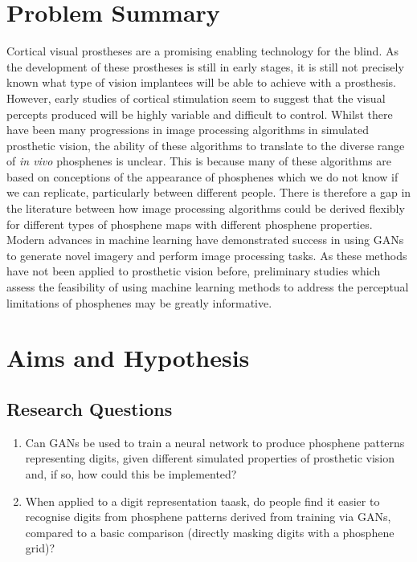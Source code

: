 \documentclass[a4paper,11pt,openany]{book}
\begin{document}
\clearpage

\chapter{Problem Summary}
\label{sec:org5a32aca}

Cortical visual prostheses are a promising enabling technology for the blind.
As the development of these prostheses is still in early stages, it is still not precisely known what type of vision implantees will be able to achieve with a prosthesis.
However, early studies of cortical stimulation seem to suggest that the visual percepts produced will be highly variable and difficult to control.
Whilst there have been many progressions in image processing algorithms in simulated prosthetic vision, the ability of these algorithms to translate to the diverse range of \emph{in vivo} phosphenes is unclear.
This is because many of these algorithms are based on conceptions of the appearance of phosphenes which we do not know if we can replicate, particularly between different people.
There is therefore a gap in the literature between how image processing algorithms could be derived flexibly for different types of phosphene maps with different phosphene properties.
Modern advances in machine learning have demonstrated success in using GANs to generate novel imagery and perform image processing tasks.
As these methods have not been applied to prosthetic vision before, preliminary studies which assess the feasibility of using machine learning methods to address the perceptual limitations of phosphenes may be greatly informative.

\chapter{Aims and Hypothesis}
\label{sec:org5885224}

\section*{Research Questions}
\label{sec:org997b38a}

\begin{enumerate}
\item Can GANs be used to train a neural network to produce phosphene patterns representing digits, given different simulated properties of prosthetic vision and, if so, how could this be implemented?
\item When applied to a digit representation taask, do people find it easier to recognise digits from phosphene patterns derived from training via GANs, compared to a basic comparison (directly masking digits with a phosphene grid)?
\end{enumerate}
\end{document}
